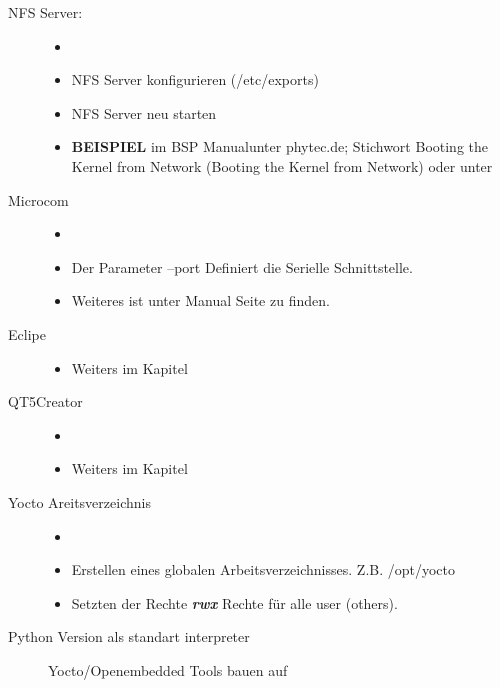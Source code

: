 \begin{description}
    \item[NFS Server:]
        \begin{itemize}
            \item[ ]
            \item NFS Server konfigurieren (/etc/exports)
            \item NFS Server neu starten
            \item \textbf{BEISPIEL} im \glqq BSP Manual\grqq unter  phytec.de;
                    Stichwort \glqq Booting the Kernel from Network\grqq
                (Booting the Kernel from Network) \cite{Pytec:BSP_Manual}
                oder unter \cite[Seite
                45]{Gonzalez2018:Embedded_Linux_Development_Using_Yocto_Project_Cookbook_2nd}
        \end{itemize}
    \item[Microcom]
        \begin{itemize}
            \item[ ]
            \item Der Parameter --port Definiert die Serielle Schnittstelle.
            \item Weiteres ist unter Manual Seite zu finden.
        \end{itemize}
    \item[Eclipe]
        \begin{itemize}
            \item Weiters im Kapitel 
        \end{itemize}
    \item[QT5Creator]
        \begin{itemize}
            \item[ ]
            \item Weiters im Kapitel 
        \end{itemize}
    \item[Yocto Areitsverzeichnis]
        \begin{itemize}
            \item[ ]
            \item Erstellen eines globalen Arbeitsverzeichnisses.  Z.B.
                /opt/yocto \item Setzten der Rechte \textbf{ \textit{rwx}}
                Rechte für alle user (\glqq others\grqq).
        \end{itemize}
    \item[Python Version als standart interpreter] Yocto/Openembedded Tools bauen auf

\end{description}
